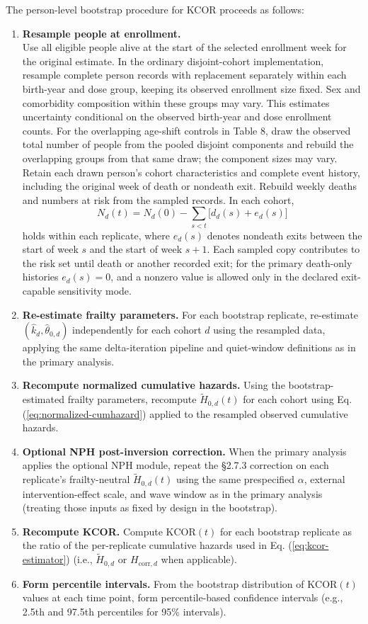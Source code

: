 \documentclass[
]{article}
\begin{document}
The person-level bootstrap procedure for KCOR proceeds as follows:

\begin{enumerate}
\def\labelenumi{\arabic{enumi}.}
\item
  \textbf{Resample people at enrollment.}\\
  Use all eligible people alive at the start of the selected enrollment week for the original estimate. In the ordinary disjoint-cohort implementation, resample complete person records with replacement separately within each birth-year and dose group, keeping its observed enrollment size fixed. Sex and comorbidity composition within these groups may vary. This estimates uncertainty conditional on the observed birth-year and dose enrollment counts. For the overlapping age-shift controls in Table 8, draw the observed total number of people from the pooled disjoint components and rebuild the overlapping groups from that same draw; the component sizes may vary. Retain each drawn person's cohort characteristics and complete event history, including the original week of death or nondeath exit. Rebuild weekly deaths and numbers at risk from the sampled records. In each cohort, \[N_d(t)=N_d(0)-\sum_{s<t}\big[d_d(s)+e_d(s)\big]\] holds within each replicate, where \(e_d(s)\) denotes nondeath exits between the start of week \(s\) and the start of week \(s+1\). Each sampled copy contributes to the risk set until death or another recorded exit; for the primary death-only histories \(e_d(s)=0\), and a nonzero value is allowed only in the declared exit-capable sensitivity mode.
\item
  \textbf{Re-estimate frailty parameters.} For each bootstrap replicate, re-estimate \((\hat{k}_d,\hat{\theta}_{0,d})\) independently for each cohort \(d\) using the resampled data, applying the same delta-iteration pipeline and quiet-window definitions as in the primary analysis.
\item
  \textbf{Recompute normalized cumulative hazards.} Using the bootstrap-estimated frailty parameters, recompute \(\tilde H_{0,d}(t)\) for each cohort using Eq. (\ref{eq:normalized-cumhazard}) applied to the resampled observed cumulative hazards.
\item
  \textbf{Optional NPH post-inversion correction.} When the primary analysis applies the optional NPH module, repeat the §2.7.3 correction on each replicate's frailty-neutral \(\tilde H_{0,d}(t)\) using the same prespecified \(\alpha\), external intervention-effect scale, and wave window as in the primary analysis (treating those inputs as fixed by design in the bootstrap).
\item
  \textbf{Recompute KCOR.} Compute \(\mathrm{KCOR}(t)\) for each bootstrap replicate as the ratio of the per-replicate cumulative hazards used in Eq. (\ref{eq:kcor-estimator}) (i.e., \(\tilde H_{0,d}\) or \(H_{\mathrm{corr},d}\) when applicable).
\item
  \textbf{Form percentile intervals.} From the bootstrap distribution of \(\mathrm{KCOR}(t)\) values at each time point, form percentile-based confidence intervals (e.g., 2.5th and 97.5th percentiles for 95\% intervals).
\end{enumerate}
\end{document}

